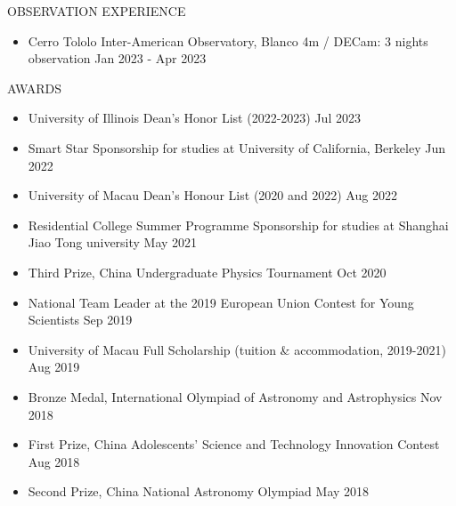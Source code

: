 \documentclass[11pt]{article}
\begin{document}

\begin{section}{OBSERVATION EXPERIENCE}
    
    \begin{itemize}[leftmargin=1.5em]
        \item Cerro Tololo Inter-American Observatory, Blanco 4m / DECam: 3 nights observation \hfill Jan 2023 - Apr 2023
    \end{itemize}

\end{section}

\begin{section}{AWARDS}

    \begin{itemize}[leftmargin=1.5em]
        \item University of Illinois Dean's Honor List (2022-2023) \hfill Jul 2023
        \item Smart Star Sponsorship for studies at University of California, Berkeley \hfill Jun 2022
        \item University of Macau Dean's Honour List (2020 and 2022) \hfill Aug 2022
        \item Residential College Summer Programme Sponsorship for studies at Shanghai Jiao Tong university \hfill May 2021
        \item Third Prize, China Undergraduate Physics Tournament \hfill Oct 2020
        \item National Team Leader at the 2019 European Union Contest for Young Scientists \hfill Sep 2019
        \item University of Macau Full Scholarship (tuition \& accommodation, 2019-2021) \hfill Aug 2019
        \item Bronze Medal, International Olympiad of Astronomy and Astrophysics \hfill Nov 2018
        \item First Prize, China Adolescents' Science and Technology Innovation Contest \hfill Aug 2018
        \item Second Prize, China National Astronomy Olympiad \hfill May 2018
    \end{itemize}
    
\end{section}
\end{document}
